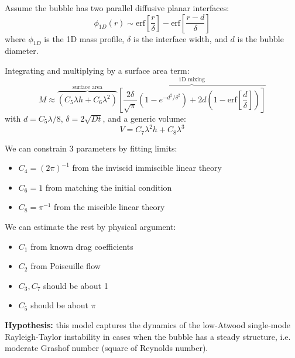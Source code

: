 \documentclass[12pt]{beamer}
\begin{document}
\begin{frame}
Assume the bubble has two parallel diffusive planar interfaces:
\begin{equation*}
\phi_{1D}(r) \sim \text{erf}\left[\frac{r}{\delta}\right] - \text{erf}\left[\frac{r - d}{\delta}\right]
\end{equation*}
where $\phi_{1D}$ is the 1D mass profile, $\delta$ is the interface width, and $d$ is the bubble diameter.
\vspace{20pt}\pause

Integrating and multiplying by a surface area term:
\begin{equation*}
M \approx \overbrace{\left(C_5 \lambda h + C_6 \lambda^2\right)}^{\text{surface area}} \overbrace{\left[\frac{2 \delta}{\sqrt{\pi}} \left(1 - e^{-d^2 / \delta^2}\right) + 2 d \left(1 - \text{erf}\left[\frac{d}{\delta}\right]\right)\right]}^{\text{1D mixing}}
\end{equation*}
with $d = C_5 \lambda / 8$, $\delta = 2 \sqrt{D t}$, and a generic volume:
\begin{equation*}
V = C_7 \lambda^2 h + C_8 \lambda^3
\end{equation*}
\end{frame}

\begin{frame}
We can constrain 3 parameters by fitting limits:
\begin{itemize}
  \item $C_4 = (2 \pi)^{-1}$ from the inviscid immiscible linear theory
  \item $C_6 = 1$ from matching the initial condition
  \item $C_8 = \pi^{-1}$ from the miscible linear theory
\end{itemize}

We can estimate the rest by physical argument:
\begin{itemize}
  \item $C_1$ from known drag coefficients
  \item $C_2$ from Poiseuille flow
  \item $C_3, C_7$ should be about 1
  \item $C_5$ should be about $\pi$
\end{itemize}
\end{frame}

\begin{frame}
\textbf{Hypothesis:} this model captures the dynamics of the low-Atwood single-mode Rayleigh-Taylor instability in cases when the bubble has a steady structure, i.e. moderate Grashof number (square of Reynolds number).
\end{frame}
\end{document}
